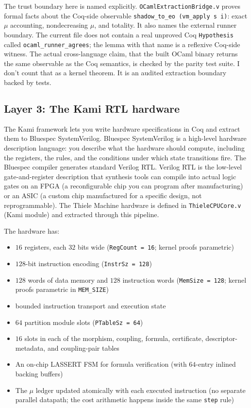 \documentclass[11pt,a4paper]{article}
\theoremstyle{plain}
\theoremstyle{definition}
\theoremstyle{remark}
\begin{document}
The trust boundary here is named explicitly. \texttt{OCamlExtractionBridge.v} proves formal facts about the Coq-side observable \texttt{shadow\_to\_eo (vm\_apply s i)}: exact $\mu$ accounting, nondecreasing $\mu$, and totality. It also names the external runner boundary. The current file does not contain a real unproved Coq \texttt{Hypothesis} called \texttt{ocaml\_runner\_agrees}; the lemma with that name is a reflexive Coq-side witness. The actual cross-language claim, that the built OCaml binary returns the same observable as the Coq semantics, is checked by the parity test suite. I don't count that as a kernel theorem. It is an audited extraction boundary backed by tests.

\subsection{Layer 3: The Kami RTL hardware}

The Kami framework lets you write hardware specifications in Coq and extract them to Bluespec SystemVerilog. Bluespec SystemVerilog is a high-level hardware description language: you describe what the hardware should compute, including the registers, the rules, and the conditions under which state transitions fire. The Bluespec compiler generates standard Verilog RTL. Verilog RTL is the low-level gate-and-register description that synthesis tools can compile into actual logic gates on an FPGA (a reconfigurable chip you can program after manufacturing) or an ASIC (a custom chip manufactured for a specific design, not reprogrammable). The Thiele Machine hardware is defined in \texttt{ThieleCPUCore.v} (Kami module) and extracted through this pipeline.

The hardware has:
\begin{itemize}
\item $16$ registers, each $32$ bits wide (\texttt{RegCount = 16}; kernel proofs parametric)
\item $128$-bit instruction encoding (\texttt{InstrSz = 128})
\item $128$ words of data memory and $128$ instruction words (\texttt{MemSize = 128}; kernel proofs parametric in \texttt{MEM\_SIZE})
\item bounded instruction transport and execution state
\item $64$ partition module slots (\texttt{PTableSz = 64})
\item $16$ slots in each of the morphism, coupling, formula, certificate, descriptor-metadata, and coupling-pair tables
\item An on-chip LASSERT FSM for formula verification (with $64$-entry inlined backing buffers)
\item The $\mu$ ledger updated atomically with each executed instruction (no separate parallel datapath; the cost arithmetic happens inside the same \texttt{step} rule)
\end{itemize}
\end{document}
